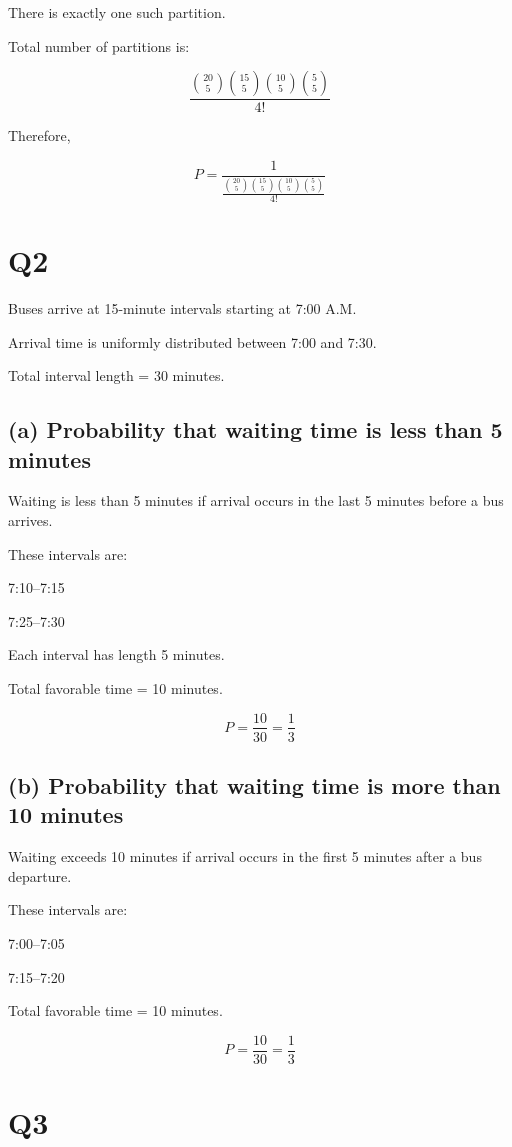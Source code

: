 \documentclass[12pt]{article}
\begin{document}
There is exactly one such partition.

Total number of partitions is:

\[
\frac{
\binom{20}{5}
\binom{15}{5}
\binom{10}{5}
\binom{5}{5}
}{4!}
\]

Therefore,

\[
P =
\frac{1}{
\frac{
\binom{20}{5}
\binom{15}{5}
\binom{10}{5}
\binom{5}{5}
}{4!}
}
\]

\section*{Q2}

Buses arrive at 15-minute intervals starting at 7:00 A.M.

Arrival time is uniformly distributed between 7:00 and 7:30.

Total interval length = 30 minutes.

\subsection*{(a) Probability that waiting time is less than 5 minutes}

Waiting is less than 5 minutes if arrival occurs in the last 5 minutes before a bus arrives.

These intervals are:

7:10--7:15

7:25--7:30

Each interval has length 5 minutes.

Total favorable time = 10 minutes.

\[
P = \frac{10}{30} = \frac{1}{3}
\]

\subsection*{(b) Probability that waiting time is more than 10 minutes}

Waiting exceeds 10 minutes if arrival occurs in the first 5 minutes after a bus departure.

These intervals are:

7:00--7:05

7:15--7:20

Total favorable time = 10 minutes.

\[
P = \frac{10}{30} = \frac{1}{3}
\]

\section*{Q3}
\end{document}
